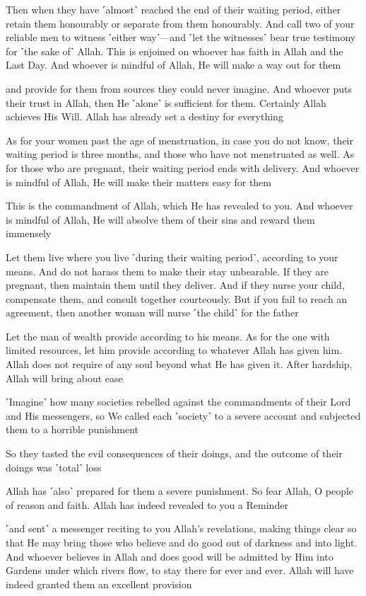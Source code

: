 Then when they have ˹almost˺ reached the end of their waiting period, either retain them honourably or separate from them honourably. And call two of your reliable men to witness ˹either way˺—and ˹let the witnesses˺ bear true testimony for ˹the sake of˺ Allah. This is enjoined on whoever has faith in Allah and the Last Day. And whoever is mindful of Allah, He will make a way out for them

and provide for them from sources they could never imagine. And whoever puts their trust in Allah, then He ˹alone˺ is sufficient for them. Certainly Allah achieves His Will. Allah has already set a destiny for everything

As for your women past the age of menstruation, in case you do not know, their waiting period is three months, and those who have not menstruated as well. As for those who are pregnant, their waiting period ends with delivery. And whoever is mindful of Allah, He will make their matters easy for them

This is the commandment of Allah, which He has revealed to you. And whoever is mindful of Allah, He will absolve them of their sins and reward them immensely

Let them live where you live ˹during their waiting period˺, according to your means. And do not harass them to make their stay unbearable. If they are pregnant, then maintain them until they deliver. And if they nurse your child, compensate them, and consult together courteously. But if you fail to reach an agreement, then another woman will nurse ˹the child˺ for the father

Let the man of wealth provide according to his means. As for the one with limited resources, let him provide according to whatever Allah has given him. Allah does not require of any soul beyond what He has given it. After hardship, Allah will bring about ease

˹Imagine˺ how many societies rebelled against the commandments of their Lord and His messengers, so We called each ˹society˺ to a severe account and subjected them to a horrible punishment

So they tasted the evil consequences of their doings, and the outcome of their doings was ˹total˺ loss

Allah has ˹also˺ prepared for them a severe punishment. So fear Allah, O people of reason and faith. Allah has indeed revealed to you a Reminder

˹and sent˺ a messenger reciting to you Allah’s revelations, making things clear so that He may bring those who believe and do good out of darkness and into light. And whoever believes in Allah and does good will be admitted by Him into Gardens under which rivers flow, to stay there for ever and ever. Allah will have indeed granted them an excellent provision

